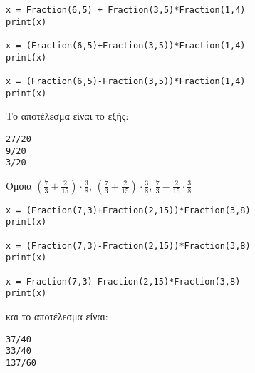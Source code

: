 \begin{lstlisting}
x = Fraction(6,5) + Fraction(3,5)*Fraction(1,4)
print(x)

x = (Fraction(6,5)+Fraction(3,5))*Fraction(1,4)
print(x)

x = (Fraction(6,5)-Fraction(3,5))*Fraction(1,4)
print(x)
\end{lstlisting}
Το αποτέλεσμα είναι το εξής:
\begin{lstlisting}
27/20
9/20
3/20
\end{lstlisting}
\begin{exercise}
Όμοια $(\frac{7}{3}+\frac{2}{15})\cdot \frac{3}{8}$, $(\frac{7}{3}+\frac{2}{15})\cdot \frac{3}{8}$, $\frac{7}{3}-\frac{2}{15}\cdot \frac{3}{8}$
\end{exercise}
\begin{lstlisting}
x = (Fraction(7,3)+Fraction(2,15))*Fraction(3,8)
print(x)

x = (Fraction(7,3)-Fraction(2,15))*Fraction(3,8)
print(x)

x = Fraction(7,3)-Fraction(2,15)*Fraction(3,8)
print(x)
\end{lstlisting}
και το αποτέλεσμα είναι:
\begin{lstlisting}
37/40
33/40
137/60
\end{lstlisting}


%
%
%
%
